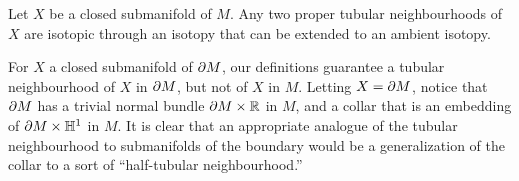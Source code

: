 \begin{theorem}
	Let $X$ be a closed submanifold of $M$.
	Any two proper tubular neighbourhoods of $X$ are isotopic through an isotopy that can be extended to an ambient isotopy.
\end{theorem}






For $X$ a closed submanifold of $\partial M$, our definitions guarantee a tubular neighbourhood of $X$ in $\partial M$, but not of $X$ in $M$.
Letting $X=\partial M$, notice that $\partial M$ has a trivial normal bundle $\partial M\times \mathbb{R}$ in $M$, and a collar that is an embedding of $\partial M\times\mathbb{H}^1$ in $M$.
It is clear that an appropriate analogue of the tubular neighbourhood to submanifolds of the boundary would be a generalization of the collar to a sort of ``half-tubular neighbourhood.''

